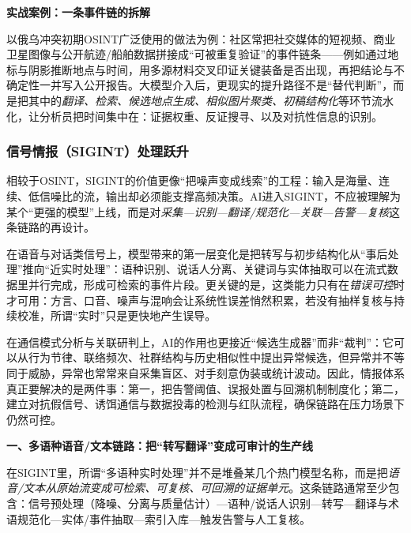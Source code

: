             {\bfseries 实战案例：一条事件链的拆解}

以俄乌冲突初期OSINT广泛使用的做法为例：社区常把社交媒体的短视频、商业卫星图像与公开航迹/船舶数据拼接成“可被重复验证”的事件链条——例如通过地标与阴影推断地点与时间，用多源材料交叉印证关键装备是否出现，再把结论与不确定性一并写入公开报告。大模型介入后，更现实的提升路径不是“替代判断”，而是把其中的\emph{翻译、检索、候选地点生成、相似图片聚类、初稿结构化}等环节流水化，让分析员把时间集中在：证据权重、反证搜寻、以及对抗性信息的识别。

\subsubsection{信号情报（SIGINT）处理跃升}

相较于OSINT，SIGINT的价值更像“把噪声变成线索”的工程：输入是海量、连续、低信噪比的流，输出却必须能支撑高频决策。AI进入SIGINT，不应被理解为某个“更强的模型”上线，而是对\emph{采集—识别—翻译/规范化—关联—告警—复核}这条链路的再设计。

在语音与对话类信号上，模型带来的第一层变化是把转写与初步结构化从“事后处理”推向“近实时处理”：语种识别、说话人分离、关键词与实体抽取可以在流式数据里并行完成，形成可检索的事件片段。更关键的是，这类能力只有在\emph{错误可控}时才可用：方言、口音、噪声与混响会让系统性误差悄然积累，若没有抽样复核与持续校准，所谓“实时”只是更快地产生误导。

在通信模式分析与关联研判上，AI的作用也更接近“候选生成器”而非“裁判”：它可以从行为节律、联络频次、社群结构与历史相似性中提出异常候选，但异常并不等同于威胁，异常也常常来自采集盲区、对手刻意伪装或统计波动。因此，情报体系真正要解决的是两件事：第一，把告警阈值、误报处置与回溯机制制度化；第二，建立对抗假信号、诱饵通信与数据投毒的检测与红队流程，确保链路在压力场景下仍然可控。


    {\bfseries 一、多语种语音/文本链路：把“转写翻译”变成可审计的生产线}

在SIGINT里，所谓“多语种实时处理”并不是堆叠某几个热门模型名称，而是把\emph{语音/文本从原始流变成可检索、可复核、可回溯的证据单元}。这条链路通常至少包含：信号预处理（降噪、分离与质量估计）—语种/说话人识别—转写—翻译与术语规范化—实体/事件抽取—索引入库—触发告警与人工复核。

